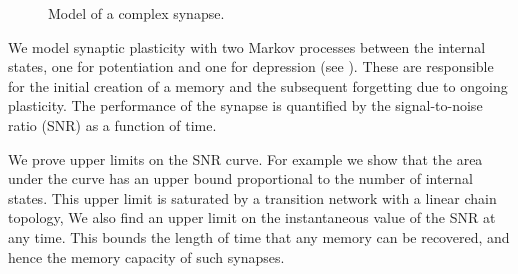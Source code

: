 \documentclass[12pt]{article}
\begin{document}
\begin{figure}
 \begin{center}
 \begin{myenuma}
   \item{}
   \hspace{0.25cm}
   \item{}
   \hspace{0.25cm}
   \item{}
 \end{myenuma}
 \end{center}
 \caption{Model of a complex synapse.}\label{fig:compsynapse}
\end{figure}

We model synaptic plasticity with two Markov processes between the internal states, one for potentiation and one for depression (see ).
These are responsible for the initial creation of a memory and the subsequent forgetting due to ongoing plasticity.
The performance of the synapse is quantified by the signal-to-noise ratio (SNR) as a function of time.

We prove upper limits on the SNR curve.
For example we show that the area under the curve has an upper bound proportional to the number of internal states.
This upper limit is saturated by a transition network with a linear chain topology,
We also find an upper limit on the instantaneous value of the SNR at any time.
This bounds the length of time that any memory can be recovered, and hence the memory capacity of such synapses.




\end{document}
